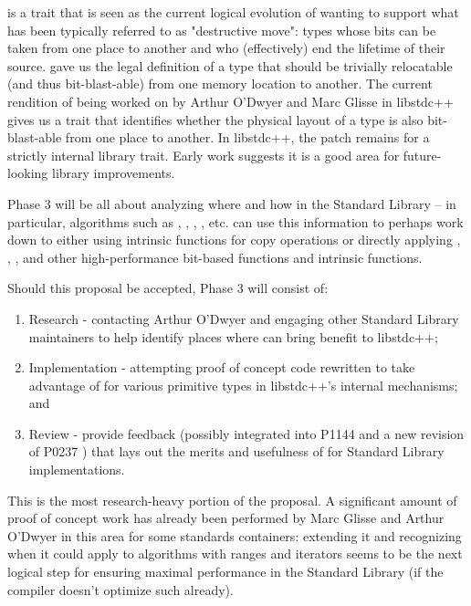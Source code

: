 \documentclass{wg21}
\begin{document}
 is a trait that is seen as the current logical evolution of wanting to support what has been typically referred to as "destructive move": types whose bits can be taken from one place to another and who (effectively) end the lifetime of their source.  gave us the legal definition of a type that should be trivially relocatable (and thus bit-blast-able) from one memory location to another. The current rendition of  being worked on by Arthur O'Dwyer and Marc Glisse in libstdc++ gives us a trait that identifies whether the physical layout of a type is also bit-blast-able from one place to another. In libstdc++, the patch remains for a strictly internal library trait. Early work suggests it is a good area for future-looking library improvements.

Phase 3 will be all about analyzing where and how in the Standard Library -- in particular, algorithms such as , , , , etc. can use this information to perhaps work down to either using intrinsic functions for copy operations or directly applying , , , and other high-performance bit-based functions and intrinsic functions.

Should this proposal be accepted, Phase 3 will consist of:

\begin{enumerate}
	\item Research - contacting Arthur O'Dwyer and engaging other Standard Library maintainers to help identify places where  can bring benefit to libstdc++;
	\item Implementation - attempting proof of concept code rewritten to take advantage of  for various primitive types in libstdc++'s internal mechanisms; and
	\item Review - provide feedback (possibly integrated into P1144 \cite{p1144} and a new revision of P0237 \cite{p0237}) that lays out the merits and usefulness of  for Standard Library implementations.
\end{enumerate} 

This is the most research-heavy portion of the proposal. A significant amount of proof of concept work has already been performed by Marc Glisse and Arthur O'Dwyer in this area for some standards containers: extending it and recognizing when it could apply to algorithms with ranges and iterators seems to be the next logical step for ensuring maximal performance in the Standard Library (if the compiler doesn't optimize such already).
\end{document}
